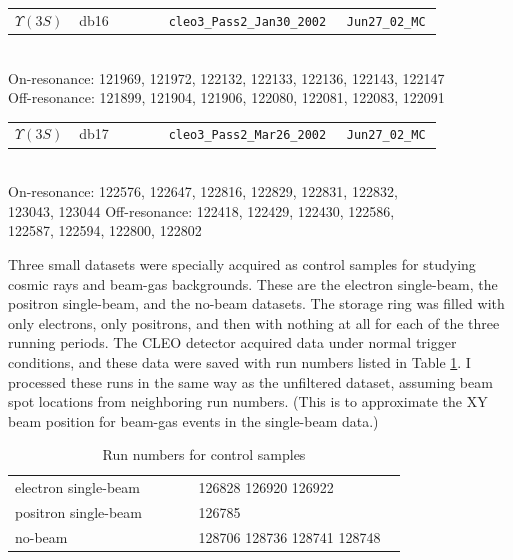 \begin{table}[p]
  \noindent \begin{tabular}{p{0.1\linewidth} p{0.2\linewidth} p{0.35\linewidth} p{0.2\linewidth}}
    $\Upsilon(3S)$ & db16 & {\tt cleo3\_Pass2\_Jan30\_2002} & {\tt Jun27\_02\_MC} \\
  \end{tabular} \\
  \mbox{\hspace{1 cm}} On-resonance: 121969, 121972, 122132, 122133, 122136, 122143, 122147 \\
  \mbox{\hspace{1 cm}} Off-resonance: 121899, 121904, 121906, 122080, 122081, 122083, 122091

  \noindent \begin{tabular}{p{0.1\linewidth} p{0.2\linewidth} p{0.35\linewidth} p{0.2\linewidth}}
    $\Upsilon(3S)$ & db17 & {\tt cleo3\_Pass2\_Mar26\_2002} & {\tt Jun27\_02\_MC} \\
  \end{tabular} \\
  \mbox{\hspace{1 cm}} On-resonance: 122576, 122647, 122816, 122829, 122831, 122832, \\
  \mbox{\hspace{1 cm}} 123043, 123044 \mbox{\hspace{0.5 cm}} Off-resonance: 122418, 122429, 122430, 122586, \\
  \mbox{\hspace{1 cm}} 122587, 122594, 122800, 122802

  \vspace{-0.5 cm}
\end{table}

Three small datasets were specially acquired as control samples for
studying cosmic rays and beam-gas backgrounds.  These are the electron
single-beam, the positron single-beam, and the no-beam datasets.  The
storage ring was filled with only electrons, only positrons, and then
with nothing at all for each of the three running periods.  The CLEO
detector acquired data under normal trigger conditions, and these data
were saved with run numbers listed in Table
\ref{datasets:singlenobeam}.  I processed these runs in the same way
as the unfiltered dataset, assuming beam spot locations from
neighboring run numbers.  (This is to approximate the XY beam position
for beam-gas events in the single-beam data.)

\begin{table}
  \caption{\label{datasets:singlenobeam} Run numbers for control samples}
  \begin{center}
    \begin{tabular}{p{0.44\linewidth} p{0.50\linewidth}}
      \hline
      electron single-beam & 126828 126920 126922 \\
      positron single-beam & 126785 \\
      no-beam & 128706 128736 128741 128748 \\\hline
    \end{tabular}
  \end{center}
\end{table}

